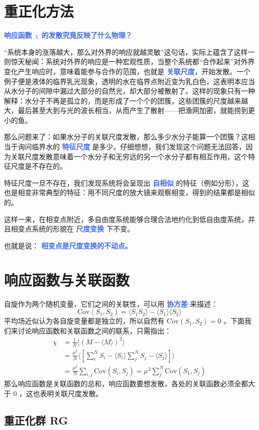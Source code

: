 \section{重正化方法}

\textcolor{RoyalBlue}{\textbf{\kaishu 响应函数 $\chi$ 的发散究竟反映了什么物理？}}

“系统本身的涨落越大，那么对外界的响应就越灵敏”这句话，实际上蕴含了这样一则惊天秘闻：系统对外界的响应是一种宏观性质，当整个系统都“合作起来”对外界变化产生响应时，意味着能参与合作的范围，也就是 \textcolor{RoyalBlue}{\textbf{\kaishu 关联尺度}}，开始发散。一个例子便是液体的临界乳光现象，透明的水在临界点附近变为乳白色，这表明本应当从水分子的间隙中漏过大部分的自然光，却大部分被散射了。这样的现象只有一种解释：水分子不再是孤立的，而是形成了一个个的团簇，这些团簇的尺度越来越大，最后甚至大到与光的波长相当，从而产生了散射——把渔网加密，就能捞到更小的鱼。

那么问题来了：如果水分子的关联尺度发散，那么多少水分子能算一个团簇？这相当于询问临界水的 \textcolor{RoyalBlue}{\textbf{\kaishu 特征尺度}} 是多少。仔细想想，我们发现这个问题无法回答，因为关联尺度发散意味着一个水分子和无穷远的另一个水分子都有相互作用，这个特征尺度是不存在的。

特征尺度一旦不存在，我们发现系统将会呈现出 \textcolor{RoyalBlue}{\textbf{\kaishu 自相似}} 的特征（例如分形），这也是相变非常典型的特征：用不同尺度的放大镜来观察相变，得到的结果都是相似的。

这样一来，在相变点附近，多自由度系统能够合理合法地约化到低自由度系统，并且相变点系统的形貌在 \textcolor{RoyalBlue}{\textbf{\kaishu 尺度变换}} 下不变。

也就是说： \textcolor{RoyalBlue}{\textbf{\kaishu 相变点是尺度变换的不动点。}}

\section{响应函数与关联函数}\label{sec:响应函数与关联函数}

自旋作为两个随机变量，它们之间的关联性，可以用 \textcolor{RoyalBlue}{\textbf{\kaishu 协方差}} 来描述：
\begin{equation}
    \text{Cov}(S_1,S_2) = \langle S_1 S_2 \rangle - \langle S_1 \rangle \langle S_2 \rangle
\end{equation}
平均场近似认为各自旋变量都是独立的，所以自然有 $\text{Cov}(S_1,S_2) = 0$ 。下面我们来讨论响应函数和关联函数之间的联系，只需指出：
\begin{equation}
    \begin{aligned}
        \chi &= \frac{1}{N} \langle (M-\langle M \rangle)^2 \rangle \\
        &= \frac{\mu^2}{N}\langle \left[\sum_i^N S_i - \langle S_i \rangle\sum_j^N S_j - \langle S_j \rangle\right] \rangle \\
        &= \frac{\mu^2}{N} \sum_{i,j}\text{Cov}(S_i,S_j) = \mu^2 \sum_{j}^N\text{Cov}(S_1,S_j)
    \end{aligned}
\end{equation}
那么响应函数是关联函数的总和，响应函数要想发散，各处的关联函数必须全都大于 $0$ ，这也表明关联尺度发散。

\subsection{重正化群 RG}